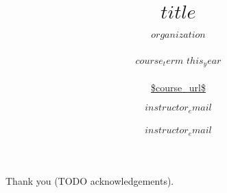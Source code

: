 
\newcommand{\courseurl}{\url{$course_url$}}
\newcommand{\thisyear}{$this_year$}

\newcommand{\mydetails}{%
    $instructor_name$ \\\\
   $instructor_email$  \\\\[1em]
   $organization$  \\\\
}



\title{ $title$ }
\subtitle{ $organization$ \\\\%
$course_term$ \thisyear\\\\%
\courseurl}

\author{ $instructor_email$ \\\\ $instructor_email$ }
\date{}
\maketitle
\tableofcontents

\vspace{10pt}\noindent Thank you (TODO acknowledgements).

\def\sectionautorefname{Section}%
\def\subsectionautorefname{Section}%
\def\subsubsectionautorefname{Section}%

\nocite{*}

